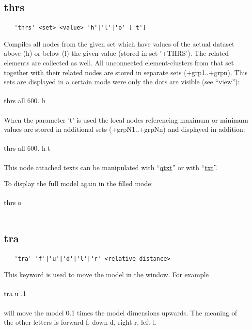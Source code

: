 \documentclass{article}
\providecommand{\htmlref}[2]{\hyperref[#2]{#1}}
\begin{document}
\subsection{\label{thrs}thrs}
\begin{verbatim}
   'thrs' <set> <value> 'h'|'l'|'o' ['t']
\end{verbatim}
Compiles all nodes from the given set which have values of the actual dataset above (h) or below (l) the given value (stored in set '+THRS'). The related elements are collected as well. All unconnected element-clusters from that set together with their related nodes are stored in separate sets (+grp1..+grpn). This sets are displayed in a certain mode were only the dots are visible (see ``\htmlref{view}{view}''):\\\\thrs all 600. h\\\\
When the parameter 't' is used the local nodes referencing maximum or minimum values are stored in additional sets (+grpN1..+grpNn) and displayed in addition:\\\\thrs all 600. h t\\\\This node attached texts can be manipulated with ``\htmlref{qtxt}{qtxt}'' or with  ``\htmlref{txt}{txt}''.

To display the full model again in the filled mode:\\\\thrs o\\\\

\subsection{\label{tra}tra}
\begin{verbatim}
   'tra' 'f'|'u'|'d'|'l'|'r' <relative-distance>
\end{verbatim}
This keyword is used to move the model in the window. For example\\\\tra u .1\\\\will move the model 0.1 times the model dimensions upwards. The meaning of the other letters is forward f, down d, right r, left l. 
\end{document}
